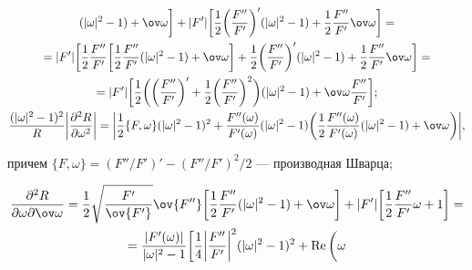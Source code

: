 \begin{pf}
\begin{gather}
(|\omega|^2-1)+\ov\omega\bigg]+|F'|\bigg[\frac{1}{2} 


\bigg(\frac{F''}{F'} \bigg)'(|\omega|^2-1)+ 


\frac{1}{2}\frac{F''}{F'}\ov\omega\bigg]=\notag\\ 


% 


=|F'|\bigg[\frac{1}{2}\frac{F''}{F'}\bigg[\frac{1}{2} 


\frac{F''}{F'}(|\omega|^2-1)+\ov\omega\bigg]+\frac{1}{2} 


\bigg(\frac{F''}{F'} \bigg)'(|\omega|^2-1)+\frac{1}{2} 


\frac{F''}{F'}\ov\omega\bigg]=\notag\\ 


% 


=|F'|\bigg[\frac{1}{2}\bigg(\bigg(\frac{F''}{F'}\bigg)'+ 


\frac{1}{2}\bigg(\frac{F''}{F'}\bigg)^2\bigg) 


(|\omega|^2-1)+\ov\omega\frac{F''}{F'}\bigg];\notag\\ 


% 


\frac{(|\omega|^2-1)^2}{R}\bigg|\frac{\partial^2R} 


{\partial\omega^2}\bigg|=\bigg|\frac{1}{2}\{F,\omega\} 


(|\omega|^2-1)^2+\frac{F''(\omega)}{F'(\omega)} 


(|\omega|^2-1)\bigg(\frac{1}{2}\frac{F''(\omega)}{F'(\omega)} 


(|\omega|^2-1)+\ov\omega\bigg)\bigg|, 


\end{gather} 


причем $\{F,\omega\}=(F''/F')'-(F''/F')^2/2$ --- производная Шварца; 


\begin{gather} 


\frac{\partial^2R}{\partial\omega\partial\ov\omega}= 


\frac{1}{2}\sqrt{\frac{F'}{\ov{F'}}}\ov{F''}\bigg[\frac{1}{2} 


\frac{F''}{F'}(|\omega|^2-1)+\ov\omega\bigg]+|F'|\bigg[ 


\frac{1}{2}\frac{F''}{F'}\omega+1\bigg]=\notag \\ 


% 


=\frac{|F'(\omega)|}{|\omega|^2-1}\bigg[\frac{1}{4}\bigg| 


\frac{F''}{F'}\bigg|^2(|\omega|^2-1)^2+\re\bigg(\omega 



\end{gather}
\end{pf}
